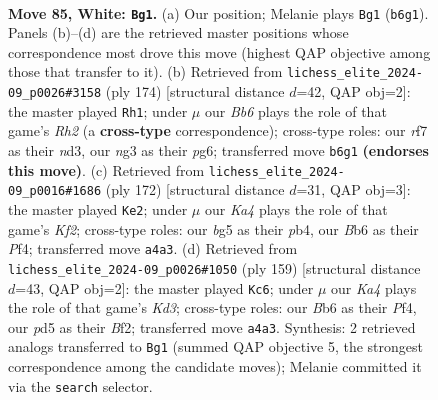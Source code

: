 \documentclass[11pt]{article}
\begin{document}
\clearpage

\begin{figure}[p]\centering
\begin{subfigure}{0.46\textwidth}\centering
\resizebox{\linewidth}{!}{%
\newchessgame
\chessboard[
  setfen={8/5r2/1B2k2p/3pp1b1/K6p/6n1/1R6/8 w - - 4 85},
  showmover=false,
  pgfstyle=straightmove, color=movearrow, markmove={b6-g1}
]}
\caption{}
\end{subfigure}\hfill
\begin{subfigure}{0.46\textwidth}\centering
\resizebox{\linewidth}{!}{%
\newchessgame
\chessboard[
  setfen={8/8/6p1/7p/6bP/3nkp2/7R/5K2 w - - 8 88},
  showmover=false,
  pgfstyle=straightmove, color=movearrow, markmove={h2-h1}
]}
\caption{}
\end{subfigure}
\\[4pt]
\begin{subfigure}{0.46\textwidth}\centering
\resizebox{\linewidth}{!}{%
\newchessgame
\chessboard[
  setfen={8/6kp/6b1/2pB4/1pP2P2/1r6/5K2/8 w - - 0 87},
  showmover=false,
  pgfstyle=straightmove, color=movearrow, markmove={f2-e2}
]}
\caption{}
\end{subfigure}\hfill
\begin{subfigure}{0.46\textwidth}\centering
\resizebox{\linewidth}{!}{%
\newchessgame
\chessboard[
  setfen={8/8/3k4/p7/5p2/1B3P1K/P4bP1/8 b - - 47 80},
  showmover=false,
  pgfstyle=straightmove, color=movearrow, markmove={d6-c6}
]}
\caption{}
\end{subfigure}
\caption{\textbf{Move 85, White: \texttt{Bg1}.} (a) Our position; Melanie plays \texttt{Bg1} (\texttt{b6g1}). Panels (b)--(d) are the retrieved master positions whose correspondence most drove this move (highest QAP objective among those that transfer to it). (b) Retrieved from \texttt{lichess\_elite\_2024-09\_p0026\#3158} (ply 174) [structural distance $d$=42, QAP obj=2]: the master played \texttt{Rh1}; under $\mu$ our \emph{Bb6} plays the role of that game's \emph{Rh2} (a \textbf{cross-type} correspondence); cross-type roles: our \emph{r}f7 as their \emph{n}d3, our \emph{n}g3 as their \emph{p}g6; transferred move \texttt{b6g1} \textbf{(endorses this move)}. (c) Retrieved from \texttt{lichess\_elite\_2024-09\_p0016\#1686} (ply 172) [structural distance $d$=31, QAP obj=3]: the master played \texttt{Ke2}; under $\mu$ our \emph{Ka4} plays the role of that game's \emph{Kf2}; cross-type roles: our \emph{b}g5 as their \emph{p}b4, our \emph{B}b6 as their \emph{P}f4; transferred move \texttt{a4a3}. (d) Retrieved from \texttt{lichess\_elite\_2024-09\_p0026\#1050} (ply 159) [structural distance $d$=43, QAP obj=2]: the master played \texttt{Kc6}; under $\mu$ our \emph{Ka4} plays the role of that game's \emph{Kd3}; cross-type roles: our \emph{B}b6 as their \emph{P}f4, our \emph{p}d5 as their \emph{B}f2; transferred move \texttt{a4a3}. Synthesis: 2 retrieved analogs transferred to \texttt{Bg1} (summed QAP objective 5, the strongest correspondence among the candidate moves); Melanie committed it via the \texttt{search} selector.}
\label{fig:thought-m168}
\end{figure}
\end{document}
